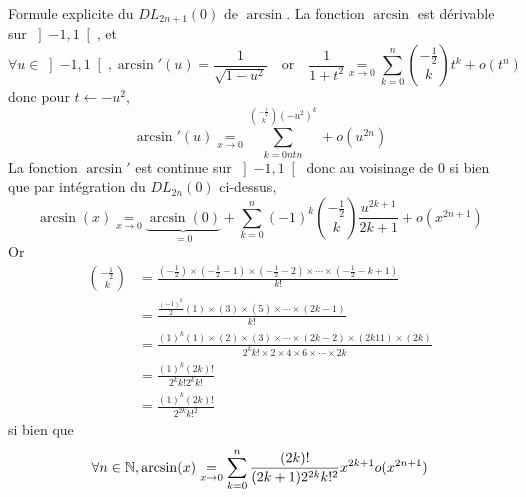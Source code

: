 \documentclass{article}
\begin{document}
\begin{question_kholle}{Formule explicite du $DL_{2n+1}(0)$ de $\arcsin$.}
	La fonction $\arcsin$ est dérivable sur $\left]-1, 1\right[$, et
			\[
			\forall u\in\left]-1,1\right[, \arcsin'(u) = \frac{1}{\sqrt{1-u^{2}}} \quad\text{or}\quad \frac{1}{1+t^{2}}\underset{x\to 0}{=} \sum_{k=0}^{n}\binom{-\frac{1}{2}}{k}t^{k} +o(t^{n})
		\]
		donc pour $t\leftarrow -u^{2}$,
		\[
			\arcsin '(u) \underset{x\to 0}{=}\sum_{k=0ntn}^{\binom{-\frac{1}{2}}{k}(-u^{2})^{k}}+o(u^{2n})
		\]
		La fonction $\arcsin'$ est continue sur $\left]-1, 1\right[$ donc au voisinage de 0 si bien que par intégration du $DL_{2n}(0)$ ci-dessus,
	\[
		\arcsin(x) \underset{x\to 0}{=} \underbrace{\arcsin(0)}_{=0} + \sum_{k=0}^{n}(-1)^{k}\binom{-\frac{1}{2}}{k}\frac{u^{2k+1}}{2k+1} + o(x^{2n+1})
	\]
	Or
	\begin{align*}
		\binom{-\frac{1}{2}}{k} & =\frac{\left(-\frac{1}{2}\right)\times \left(-\frac{1}{2}-1\right)\times \left(-\frac{1}{2}-2\right)\times \cdots \times \left(-\frac{1}{2}-k+1\right)}{k!} \\
		                        & =\frac{\frac{(-1)^{k}}{2}(1)\times (3)\times (5)\times \cdots \times (2k-1)}{k!}                                                                            \\
		                        & = \frac{(1)^{k} (1)\times (2)\times (3)\times \cdots \times (2k-2) \times (2k11)\times (2k)}{2^{k}k! \times 2 \times 4 \times 6 \times \cdots \times 2k}    \\
		                        & = \frac{(1)^{k}(2k)!}{2^{k}k!2^{k}k!}                                                                                                                       \\
		                        & = \frac{(1)^{k}(2k)!}{2^{2k}k!^{2}}
	\end{align*}
	si bien que
	\[
		\forall n\in\mathbb N, \arcsin(x) \underset{x\to 0}{=}\sum_{k=0}^{n}\frac{(2k)!}{(2k+1)2^{2k}k!^{2}}x^{2k+1}o(x^{2n+1})
	\]
\end{question_kholle}
\end{document}
